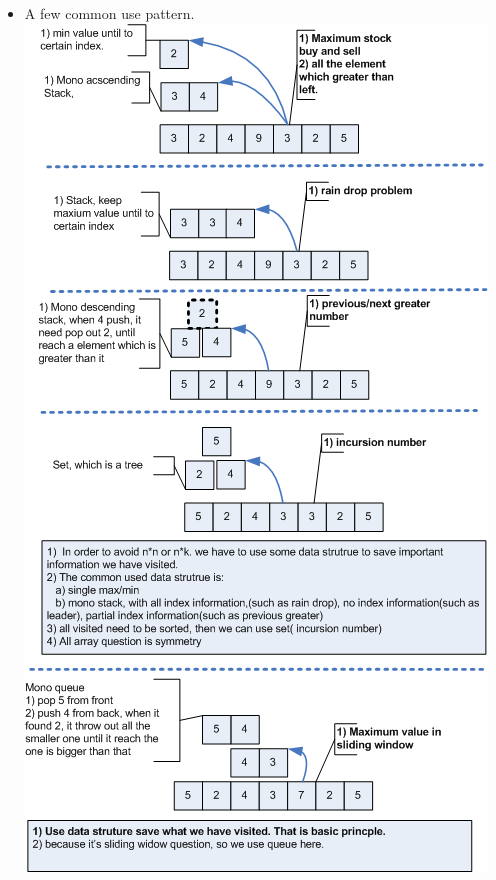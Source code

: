 \documentclass[a4paper,11pt,twoside]{book}
\begin{document}
\begin{itemize}
	\item A few common use pattern.  \newline
	\includegraphics[scale=0.65]{pics/array.png} \newline
	
\end{itemize}
\end{document}
